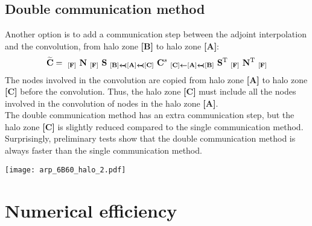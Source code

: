 \documentclass[12pt]{scrartcl}
\begin{document}
\subsection{Double communication method}
Another option is to add a communication step between the adjoint interpolation and the convolution, from halo zone \textbf{[B]} to halo zone \textbf{[A]}:
\begin{align}
\widetilde{\mathbf{C}} = \ _{\mathbf{[F]}} \ \mathbf{N} \ _{\mathbf{[F]}} \ \mathbf{S} \ _{\mathbf{[B]} \text{$\mathrlap{\boldsymbol{\leftarrow}}\boldsymbol{\prec}$} \mathbf{[A]} \text{$\mathrlap{\boldsymbol{\leftarrow}}\boldsymbol{\prec}$} \mathbf{[C]}} \ \mathbf{C}^s \ _{\mathbf{[C]} \boldsymbol{\leftarrow} \mathbf{[A]} \text{$\mathrlap{\boldsymbol{\leftarrow}}\boldsymbol{\prec}$} \mathbf{[B]}} \ \mathbf{S}^{\mathrm{T}} \ _{\mathbf{[F]}} \ \mathbf{N}^{\mathrm{T}} \ _{\mathbf{[F]}}
\end{align}
The nodes involved in the convolution are copied from halo zone \textbf{[A]} to halo zone \textbf{[C]} before the convolution. Thus, the halo zone \textbf{[C]} must include all the nodes involved in the convolution of nodes in the halo zone \textbf{[A]}.\\
$  $\\
The double communication method has an extra communication step, but the halo zone \textbf{[C]} is slightly reduced compared to the single communication method. Surprisingly, preliminary tests show that the double communication method is always faster than the single communication method.

\begin{center}
\texttt{[image: arp\_6B60\_halo\_2.pdf]}
\end{center}

\section{Numerical efficiency}
\end{document}

